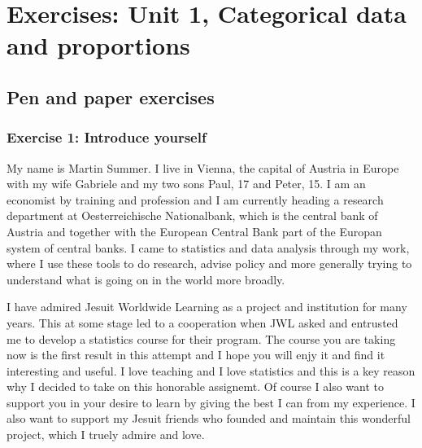 \documentclass[letterpaper,10pt,english]{jupyterBook}
\begin{document}
\sphinxstepscope


\chapter{Exercises: Unit 1, Categorical data and proportions}
\label{\detokenize{exercises_unit_1:exercises-unit-1-categorical-data-and-proportions}}\label{\detokenize{exercises_unit_1::doc}}

\section{Pen and paper exercises}
\label{\detokenize{exercises_unit_1:pen-and-paper-exercises}}

\subsection{Exercise 1: Introduce yourself}
\label{\detokenize{exercises_unit_1:exercise-1-introduce-yourself}}
\sphinxAtStartPar
My name is Martin Summer. I live in Vienna, the capital of Austria in Europe with my wife Gabriele and my two sons Paul, 17 and Peter, 15. I am an economist by training and profession and I am currently heading a research department at Oesterreichische Nationalbank, which is the central bank of Austria and together with the European Central Bank part of the Europan system of central banks. I came to statistics and data analysis through my work, where I use these tools to do research, advise policy and more generally trying to understand what is going on in the world more broadly.

\sphinxAtStartPar
I have admired Jesuit Worldwide Learning as a project and institution for many years. This at some stage led to a cooperation when JWL asked and entrusted me to develop a statistics course for their program. The course you are taking now is the first result in this attempt and I hope you will enjy it and find it interesting and useful. I love teaching and I love statistics and this is a key reason why I decided to take on this honorable assignemt. Of course I also want to support you in your desire to learn by giving the best I can from my experience. I also want to support my Jesuit friends who founded and maintain this wonderful project, which I truely admire and love.
\end{document}
